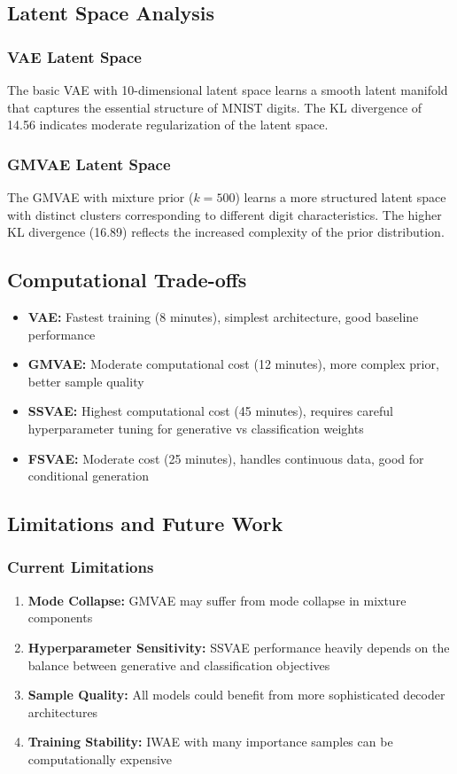 \documentclass{article}
\begin{document}
\subsection{Latent Space Analysis}

\subsubsection{VAE Latent Space}
The basic VAE with 10-dimensional latent space learns a smooth latent manifold that captures the essential structure of MNIST digits. The KL divergence of 14.56 indicates moderate regularization of the latent space.

\subsubsection{GMVAE Latent Space}
The GMVAE with mixture prior ($k=500$) learns a more structured latent space with distinct clusters corresponding to different digit characteristics. The higher KL divergence (16.89) reflects the increased complexity of the prior distribution.

\subsection{Computational Trade-offs}

\begin{itemize}
\item \textbf{VAE:} Fastest training (8 minutes), simplest architecture, good baseline performance
\item \textbf{GMVAE:} Moderate computational cost (12 minutes), more complex prior, better sample quality
\item \textbf{SSVAE:} Highest computational cost (45 minutes), requires careful hyperparameter tuning for generative vs classification weights
\item \textbf{FSVAE:} Moderate cost (25 minutes), handles continuous data, good for conditional generation
\end{itemize}

\subsection{Limitations and Future Work}

\subsubsection{Current Limitations}
\begin{enumerate}
\item \textbf{Mode Collapse:} GMVAE may suffer from mode collapse in mixture components
\item \textbf{Hyperparameter Sensitivity:} SSVAE performance heavily depends on the balance between generative and classification objectives
\item \textbf{Sample Quality:} All models could benefit from more sophisticated decoder architectures
\item \textbf{Training Stability:} IWAE with many importance samples can be computationally expensive
\end{enumerate}
\end{document}
